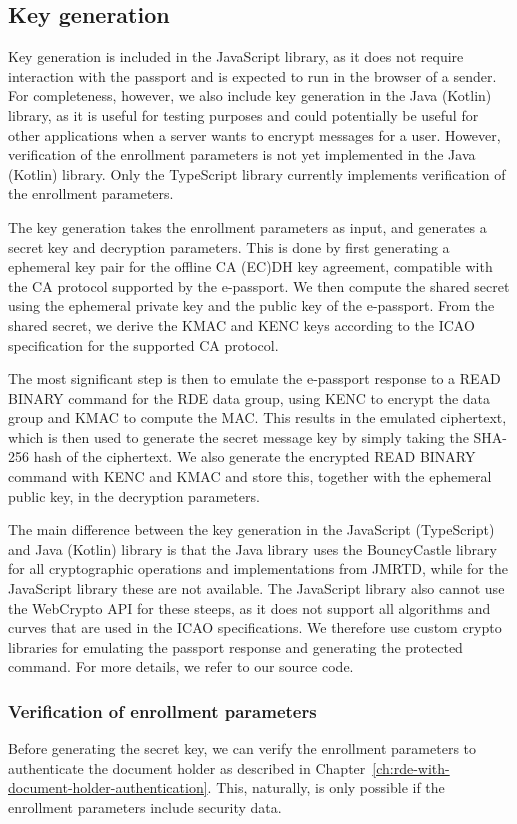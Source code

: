 \subsection{Key generation}\label{subsec:key-generation}
Key generation is included in the JavaScript library, as it does not require interaction with the passport and is expected to run in the browser of a sender.
For completeness, however, we also include key generation in the Java (Kotlin) library, as it is useful for testing purposes and could potentially be useful for other applications when a server wants to encrypt messages for a user.
However, verification of the enrollment parameters is not yet implemented in the Java (Kotlin) library.
Only the TypeScript library currently implements verification of the enrollment parameters.

The key generation takes the enrollment parameters as input, and generates a secret key and decryption parameters.
This is done by first generating a ephemeral key pair for the offline CA (EC)DH key agreement, compatible with the CA protocol supported by the e-passport.
We then compute the shared secret using the ephemeral private key and the public key of the e-passport.
From the shared secret, we derive the KMAC and KENC keys according to the ICAO specification for the supported CA protocol.

The most significant step is then to emulate the e-passport response to a READ BINARY command for the RDE data group, using KENC to encrypt the data group and KMAC to compute the MAC.
This results in the emulated ciphertext, which is then used to generate the secret message key by simply taking the SHA-256 hash of the ciphertext.
We also generate the encrypted READ BINARY command with KENC and KMAC and store this, together with the ephemeral public key, in the decryption parameters.

The main difference between the key generation in the JavaScript (TypeScript) and Java (Kotlin) library is that the Java library uses the BouncyCastle library for all cryptographic operations and implementations from JMRTD, while for the JavaScript library these are not available.
The JavaScript library also cannot use the WebCrypto API for these steeps, as it does not support all algorithms and curves that are used in the ICAO specifications.
We therefore use custom crypto libraries for emulating the passport response and generating the protected command.
For more details, we refer to our source code.

\subsubsection{Verification of enrollment parameters}\label{subsubsec:verification-of-enrollment-parameters}
Before generating the secret key, we can verify the enrollment parameters to authenticate the document holder as described in Chapter~\ref{ch:rde-with-document-holder-authentication}.
This, naturally, is only possible if the enrollment parameters include security data.

